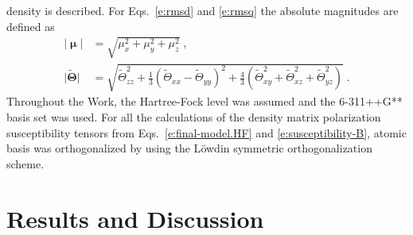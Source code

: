 \documentclass[aip,amsmath,amssymb,reprint]{revtex4-1}
\newcommand{\BM}[1]{\bm{#1}}
\begin{document}
density is described. For Eqs.~\eqref{e:rmsd} and \eqref{e:rmsq} the absolute magnitudes
are defined as
%
\begin{subequations}\label{e:absmagn}
  \begin{align}
   \lvert {\BM\upmu} \rvert &= \sqrt{\mu_x^2+\mu_y^2+\mu_z^2} \;,\\
   \lvert {\widetilde{\BM\Theta}}\rvert &= 
          \sqrt{\widetilde{\Theta}_{zz}^2 + \frac{1}{3}\left(\widetilde{\Theta}_{xx}-\widetilde{\Theta}_{yy}\right)^2 
          + \frac{4}{3}\left( \widetilde{\Theta}_{xy}^2 + \widetilde{\Theta}_{xz}^2 + \widetilde{\Theta}_{yz}^2 \right)} \;. 
  \end{align}
\end{subequations}
%
Throughout the Work, the Hartree\hyp{}Fock level was assumed and the 6-311++G** basis set
was used. For all the calculations of the density matrix polarization susceptibility tensors
from Eqs.~\eqref{e:final-model.HF} and \eqref{e:susceptibility-B}, 
atomic basis was orthogonalized by using the L{\"o}wdin symmetric orthogonalization scheme.


\section{\label{s:4}Results and Discussion}
\end{document}
